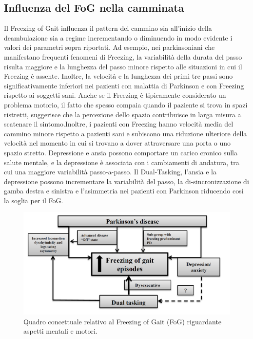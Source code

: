\subsection{Influenza del FoG nella camminata}
Il Freezing of Gait influenza il pattern del cammino sia all’inizio della deambulazione sia a regime incrementando o diminuendo in modo evidente i valori dei parametri sopra riportati. Ad esempio, nei parkinsoniani che manifestano frequenti fenomeni di Freezing, la variabilità della durata del passo risulta maggiore e la lunghezza del passo minore rispetto alle situazioni in cui il Freezing è assente. Inoltre, la velocità e la lunghezza dei primi tre passi sono significativamente inferiori nei pazienti con malattia di Parkinson e con Freezing rispetto ai soggetti sani. Anche se il Freezing è tipicamente considerato un problema motorio, il fatto che spesso compaia quando il paziente si trova in spazi ristretti, suggerisce che la percezione dello spazio contribuisce in larga misura a scatenare il sintomo\cite{37}.Inoltre, i pazienti con Freezing hanno velocità media del cammino minore rispetto a pazienti sani e subiscono una riduzione ulteriore della velocità nel momento in cui si trovano a dover attraversare una porta o uno spazio stretto. Depressione e ansia possono comportare un carico cronico sulla salute mentale, e la depressione è associata con i cambiamenti di andatura, tra cui una maggiore variabilità passo-a-passo. Il Dual-Tasking, l’ansia e la depressione possono incrementare la variabilità del passo, la di-sincronizzazione di gamba destra e sinistra e l'asimmetria nei pazienti con Parkinson riducendo così la soglia per il FoG. \\
\begin{figure}[]
	\centering
	\includegraphics[scale=0.4]{images/Schema_Concettuale_Stress.png}
	\caption{Quadro concettuale relativo al Freezing of Gait (FoG) riguardante aspetti mentali e motori.}
\end{figure}

